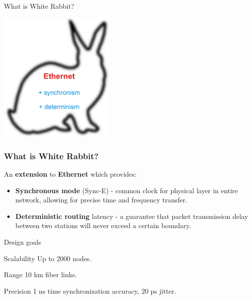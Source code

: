\documentclass[compress,red]{beamer}
\begin{document}
\begin{frame}{What is White Rabbit?}
\begin{center}
\includegraphics[height=6.5cm]{rabbit.png}
\end{center}
\end{frame}

\frame
{
  \frametitle{What is White Rabbit?}

\begin{block}{}
  An \textbf{extension} to \textbf{Ethernet} which provides:
  \begin{itemize}
  \item \textbf{Synchronous mode} (Sync-E) - common clock for physical layer in entire network, allowing for precise time and frequency transfer.

\item \textbf{Deterministic routing} latency - a guarantee that packet transmission delay between two stations will never exceed a certain boundary.
\end{itemize}
\end{block}

}

\begin{frame}{Design goals}
\begin{block}{Scalability}
Up to 2000 nodes.
\end{block}

\begin{block}{Range}
10 km fiber links.
\end{block}

\begin{block}{Precision}
1 ns time synchronization accuracy, 20 ps jitter.
\end{block}

\end{frame}
\end{document}
